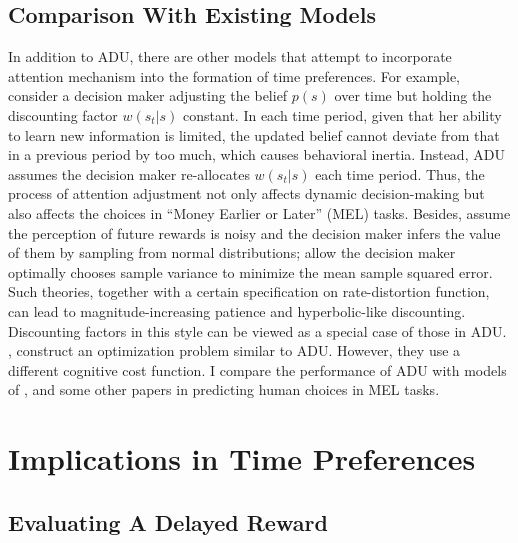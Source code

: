 \documentclass[
  12pt,
]{article}
\begin{document}
\hypertarget{comparison-with-existing-models}{%
\subsection{Comparison With Existing
Models}\label{comparison-with-existing-models}}

In addition to ADU, there are other models that attempt to incorporate
attention mechanism into the formation of time preferences. For example,
\citet{steiner_rational_2017} consider a decision maker adjusting the
belief \(p(s)\) over time but holding the discounting factor
\(w(s_t|s)\) constant. In each time period, given that her ability to
learn new information is limited, the updated belief cannot deviate from
that in a previous period by too much, which causes behavioral inertia.
Instead, ADU assumes the decision maker re-allocates \(w(s_t|s)\) each
time period. Thus, the process of attention adjustment not only affects
dynamic decision-making but also affects the choices in ``Money Earlier
or Later'' (MEL) tasks. Besides, \citet{gabaix_myopia_2017} assume the
perception of future rewards is noisy and the decision maker infers the
value of them by sampling from normal distributions;
\citet{gershman_rationally_2020} allow the decision maker optimally
chooses sample variance to minimize the mean sample squared error. Such
theories, together with a certain specification on rate-distortion
function, can lead to magnitude-increasing patience and hyperbolic-like
discounting. Discounting factors in this style can be viewed as a
special case of those in ADU. \citet{noor_optimal_2022},
\citet{noor_constrained_2023} construct an optimization problem similar
to ADU. However, they use a different cognitive cost function. I compare
the performance of ADU with models of \citet{gershman_rationally_2020},
\citet{noor_optimal_2022} and some other papers in predicting human
choices in MEL tasks.

\hypertarget{implications-in-time-preferences}{%
\section{\texorpdfstring{Implications in Time Preferences
\label{behavioral}}{Implications in Time Preferences }}\label{implications-in-time-preferences}}

\hypertarget{evaluating-a-delayed-reward}{%
\subsection{Evaluating A Delayed
Reward}\label{evaluating-a-delayed-reward}}
\end{document}
